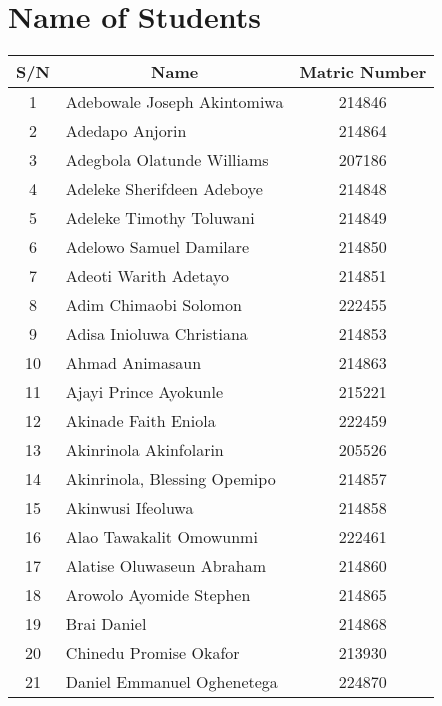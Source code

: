 \documentclass[a4paper]{article}
\begin{document}
	\pagestyle{fancy}
	\fancyhead{}

    \section*{Name of Students}
    \begin{center}
        \Large
        \begin{longtable} { c|l|c }
            \toprule[1pt]
            S/N & \multicolumn{1}{|c|}{Name} & Matric Number \\
            \midrule
            1 & Adebowale Joseph Akintomiwa & 214846\\
            2 & Adedapo Anjorin & 214864\\
            3 & Adegbola Olatunde Williams & 207186\\
            4 & Adeleke Sherifdeen Adeboye & 214848\\
            5 & Adeleke Timothy Toluwani & 214849\\
            6 & Adelowo Samuel Damilare & 214850\\
            7 & Adeoti Warith Adetayo & 214851\\
            8 & Adim Chimaobi Solomon & 222455\\
            9 & Adisa Inioluwa Christiana & 214853\\
            10 & Ahmad Animasaun & 214863\\
            11 & Ajayi Prince Ayokunle & 215221\\
            12 & Akinade Faith Eniola & 222459\\
            13 & Akinrinola Akinfolarin & 205526\\
            14 & Akinrinola, Blessing Opemipo & 214857\\
            15 & Akinwusi Ifeoluwa & 214858\\
            16 & Alao Tawakalit Omowunmi & 222461\\
            17 & Alatise Oluwaseun Abraham & 214860\\
            18 & Arowolo Ayomide Stephen & 214865\\
            19 & Brai Daniel & 214868\\
            20 & Chinedu Promise Okafor & 213930\\
            21 & Daniel Emmanuel Oghenetega & 224870\\

\end{longtable}
\end{center}
\end{document}
